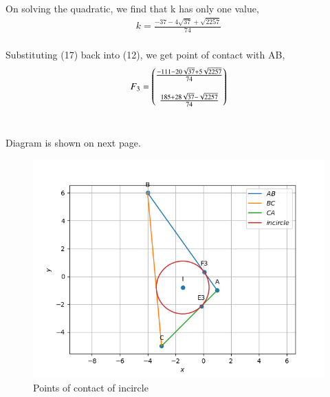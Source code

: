 \documentclass[journal,12pt,twocolumn]{IEEEtran}
\theoremstyle{remark}
\begin{document}
\begin{flushleft}
	On solving the quadratic, we find that k has only one value,
	\begin{align}
		k = \frac{-37-4\sqrt{37}+\sqrt{2257}}{74}
	\end{align}\\

	Substituting (17) back into (12), we get point of contact with AB,
	\begin{align}
		{F}_3 = \begin{pmatrix}
			\frac{-111-20\sqrt{37}+5\sqrt{2257}}{74}\\ \\
			\frac{185+28\sqrt{37}-\sqrt{2257}}{74}
		\end{pmatrix}
	\end{align}\\
	
	\bigskip

	Diagram is shown on next page.

\end{flushleft}

\newpage

\begin{figure}[h]
	\centering
	\includegraphics[width=\columnwidth]{./Diagram.png}
	\caption{Points of contact of incircle}
	\label{Incircle}
\end{figure}
\end{document}
